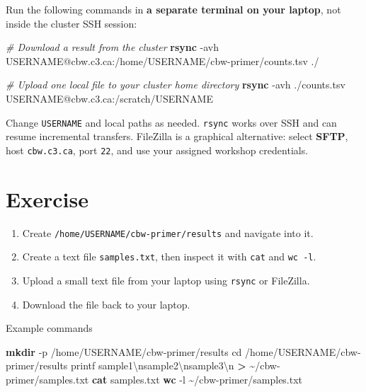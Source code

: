 \documentclass[
]{book}
\newenvironment{Shaded}{\begin{snugshade}}{\end{snugshade}}
\newcommand{\AttributeTok}[1]{\textcolor[rgb]{0.13,0.29,0.53}{#1}}
\newcommand{\BuiltInTok}[1]{#1}
\newcommand{\CommentTok}[1]{\textcolor[rgb]{0.56,0.35,0.01}{\textit{#1}}}
\newcommand{\FunctionTok}[1]{\textcolor[rgb]{0.13,0.29,0.53}{\textbf{#1}}}
\newcommand{\NormalTok}[1]{#1}
\newcommand{\OperatorTok}[1]{\textcolor[rgb]{0.81,0.36,0.00}{\textbf{#1}}}
\newcommand{\StringTok}[1]{\textcolor[rgb]{0.31,0.60,0.02}{#1}}
\providecommand{\tightlist}{%
  \setlength{\itemsep}{0pt}\setlength{\parskip}{0pt}}
\begin{document}
Run the following commands in \textbf{a separate terminal on your laptop}, not inside the cluster SSH session:

\begin{Shaded}
\begin{Highlighting}[]
\CommentTok{\# Download a result from the cluster}
\FunctionTok{rsync} \AttributeTok{{-}avh}\NormalTok{ USERNAME@cbw.c3.ca:/home/USERNAME/cbw{-}primer/counts.tsv ./}

\CommentTok{\# Upload one local file to your cluster home directory}
\FunctionTok{rsync} \AttributeTok{{-}avh}\NormalTok{ ./counts.tsv USERNAME@cbw.c3.ca:/scratch/USERNAME}
\end{Highlighting}
\end{Shaded}

Change \texttt{USERNAME} and local paths as needed. \texttt{rsync} works over SSH and can resume incremental transfers. FileZilla is a graphical alternative: select \textbf{SFTP}, host \texttt{cbw.c3.ca}, port \texttt{22}, and use your assigned workshop credentials.

\section{Exercise}\label{exercise}

\begin{enumerate}
\def\labelenumi{\arabic{enumi}.}
\tightlist
\item
  Create \texttt{/home/USERNAME/cbw-primer/results} and navigate into it.
\item
  Create a text file \texttt{samples.txt}, then inspect it with \texttt{cat} and \texttt{wc\ -l}.
\item
  Upload a small text file from your laptop using \texttt{rsync} or FileZilla.
\item
  Download the file back to your laptop.
\end{enumerate}

Example commands

\begin{Shaded}
\begin{Highlighting}[]
\FunctionTok{mkdir} \AttributeTok{{-}p}\NormalTok{ /home/USERNAME/cbw{-}primer/results}
\BuiltInTok{cd}\NormalTok{ /home/USERNAME/cbw{-}primer/results}
\BuiltInTok{printf} \StringTok{\textquotesingle{}sample1\textbackslash{}nsample2\textbackslash{}nsample3\textbackslash{}n\textquotesingle{}} \OperatorTok{\textgreater{}}\NormalTok{ \textasciitilde{}/cbw{-}primer/samples.txt}
\FunctionTok{cat}\NormalTok{ samples.txt}
\FunctionTok{wc} \AttributeTok{{-}l}\NormalTok{ \textasciitilde{}/cbw{-}primer/samples.txt}
\end{Highlighting}
\end{Shaded}
\end{document}
